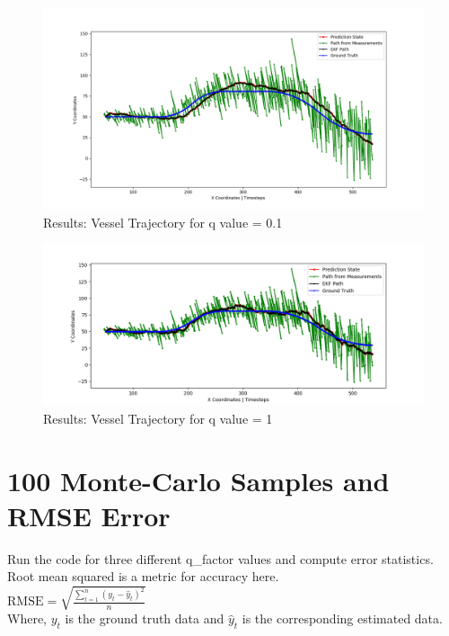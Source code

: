 \documentclass[12pt]{article}
\begin{document}
\begin{figure}[]
\centering
\includegraphics[width=\textwidth]{../results/path_q0_1.png}
\caption{Results: Vessel Trajectory for q value = 0.1}
\label{fig:EKF_2}
\end{figure}

\begin{figure}[]
\centering
\includegraphics[width=\textwidth]{../results/path_q1.png}
\caption{Results: Vessel Trajectory for q value = 1}
\label{fig:EKF_3}
\end{figure}
  
  
  

\section{100 Monte-Carlo Samples and RMSE Error}
Run the code for three different q\_factor values and compute error statistics. Root mean squared is a metric for accuracy here. \\

$\mathrm{RMSE} = \sqrt{\frac{\sum_{t=1}^{n}{(y_t - \hat{y}_t)^2}}{n}}$\\

Where, $y_{t}$ is the ground truth data and $\hat{y}_{t}$ is the corresponding estimated data.\\
\end{document}
